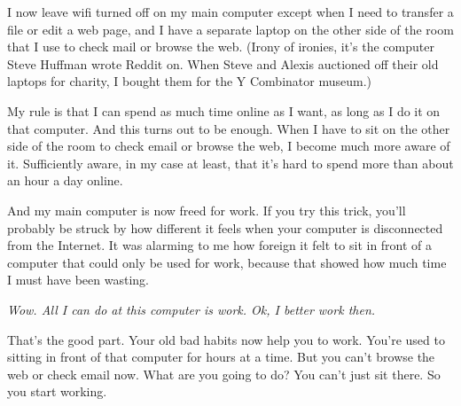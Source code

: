 I now leave wifi turned off on my main computer except when I need to
transfer a file or edit a web page, and I have a separate laptop on the
other side of the room that I use to check mail or browse the web.
(Irony of ironies, it's the computer Steve Huffman wrote Reddit on. When
Steve and Alexis auctioned off their old laptops for charity, I bought
them for the Y Combinator museum.)

My rule is that I can spend as much time online as I want, as long as I
do it on that computer. And this turns out to be enough. When I have to
sit on the other side of the room to check email or browse the web, I
become much more aware of it. Sufficiently aware, in my case at least,
that it's hard to spend more than about an hour a day online.

And my main computer is now freed for work. If you try this trick,
you'll probably be struck by how different it feels when your computer
is disconnected from the Internet. It was alarming to me how foreign it
felt to sit in front of a computer that could only be used for work,
because that showed how much time I must have been wasting.

\emph{Wow. All I can do at this computer is work. Ok, I better work
then.}

That's the good part. Your old bad habits now help you to work. You're
used to sitting in front of that computer for hours at a time. But you
can't browse the web or check email now. What are you going to do? You
can't just sit there. So you start working.
